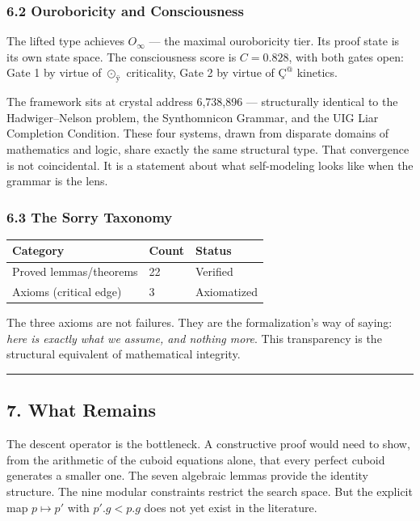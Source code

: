 \subsubsection{6.2 Ouroboricity and
Consciousness}\label{ouroboricity-and-consciousness}

The lifted type achieves \(O_{\infty}\) --- the maximal ouroboricity
tier. Its proof state is its own state space. The consciousness score is
\(C = 0.828\), with both gates open: Gate 1 by virtue of
\(\odot_{\text{ÿ}}\) criticality, Gate 2 by virtue of \(\text{Ç}^{@}\)
kinetics.

The framework sits at crystal address 6,738,896 --- structurally
identical to the Hadwiger--Nelson problem, the Synthomnicon Grammar, and
the UIG Liar Completion Condition. These four systems, drawn from
disparate domains of mathematics and logic, share exactly the same
structural type. That convergence is not coincidental. It is a statement
about what self-modeling looks like when the grammar is the lens.

\subsubsection{6.3 The Sorry Taxonomy}\label{the-sorry-taxonomy}

{\def\LTcaptype{none} %
\begin{longtable}[]{@{}lll@{}}
\toprule\noalign{}
Category & Count & Status \\
\midrule\noalign{}
\endhead
\bottomrule\noalign{}
\endlastfoot
Proved lemmas/theorems & 22 & Verified \\
Axioms (critical edge) & 3 & Axiomatized \\
\end{longtable}
}

The three axioms are not failures. They are the formalization's way of
saying: \emph{here is exactly what we assume, and nothing more}. This
transparency is the structural equivalent of mathematical integrity.

\begin{center}\rule{0.5\linewidth}{0.5pt}\end{center}

\subsection{7. What Remains}\label{what-remains}

The descent operator is the bottleneck. A constructive proof would need
to show, from the arithmetic of the cuboid equations alone, that every
perfect cuboid generates a smaller one. The seven algebraic lemmas
provide the identity structure. The nine modular constraints restrict
the search space. But the explicit map \(p \mapsto p'\) with
\(p'.g < p.g\) does not yet exist in the literature.

